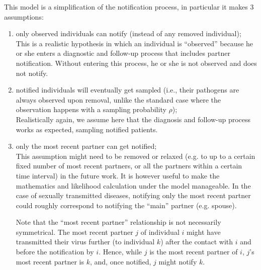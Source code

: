 \documentclass[a4paper,10pt]{article}
\begin{document}
This model is a simplification of the notification process, in particular it makes 3 assumptions:
\begin{enumerate}
\item only observed individuals can notify (instead of any removed individual);\\

This is a realistic hypothesis in which an individual is ``observed'' because he or she enters a diagnostic and follow-up process that includes partner notification. Without entering this process, he or she is not observed and does not notify.

\item notified individuals will eventually get sampled (i.e., their pathogens are always observed upon removal, unlike the standard case where the observation happens with a sampling probability $\rho$);\\

Realistically again, we assume here that the diagnosis and follow-up process works as expected, sampling notified patients.

%

\item only the most recent partner can get notified;\\

This assumption might need to be removed or relaxed (e.g. to up to a certain fixed number of most recent partners, or all the partners within a certain time interval) in the future work. It is however useful to make the mathematics and likelihood calculation under the model manageable. In the case of sexually transmitted diseases, notifying only the most recent partner could roughly correspond to notifying the ``main'' partner (e.g. spouse).

Note that the ``most recent partner'' relationship is not necessarily symmetrical. The most recent partner $j$ of individual $i$ might have transmitted their virus further (to individual $k$) after the contact with $i$ and before the notification by $i$. Hence, while $j$ is the most recent partner of $i$, $j$'s most recent partner is $k$, and, once notified, $j$ might notify $k$.  
\end{enumerate}
\end{document}
